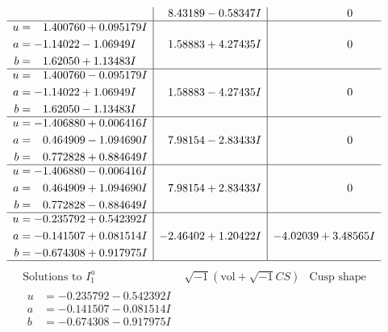 \documentclass[1p]{elsarticle_modified}
\theoremstyle{definition}
\newcommand{\I}{\sqrt{-1}}
\begin{document}
$$\begin{array}{c|c|c}
 & \phantom{-}8.43189 - 0.58347 I & \phantom{-0.000000 } 0 \\ \hline\begin{aligned}
u &= \phantom{-}1.400760 + 0.095179 I \\
a &= -1.14022 - 1.06949 I \\
b &= \phantom{-}1.62050 + 1.13483 I\end{aligned}
 & \phantom{-}1.58883 + 4.27435 I & \phantom{-0.000000 } 0 \\ \hline\begin{aligned}
u &= \phantom{-}1.400760 - 0.095179 I \\
a &= -1.14022 + 1.06949 I \\
b &= \phantom{-}1.62050 - 1.13483 I\end{aligned}
 & \phantom{-}1.58883 - 4.27435 I & \phantom{-0.000000 } 0 \\ \hline\begin{aligned}
u &= -1.406880 + 0.006416 I \\
a &= \phantom{-}0.464909 - 1.094690 I \\
b &= \phantom{-}0.772828 + 0.884649 I\end{aligned}
 & \phantom{-}7.98154 - 2.83433 I & \phantom{-0.000000 } 0 \\ \hline\begin{aligned}
u &= -1.406880 - 0.006416 I \\
a &= \phantom{-}0.464909 + 1.094690 I \\
b &= \phantom{-}0.772828 - 0.884649 I\end{aligned}
 & \phantom{-}7.98154 + 2.83433 I & \phantom{-0.000000 } 0 \\ \hline\begin{aligned}
u &= -0.235792 + 0.542392 I \\
a &= -0.141507 + 0.081514 I \\
b &= -0.674308 + 0.917975 I\end{aligned}
 & -2.46402 + 1.20422 I & -4.02039 + 3.48565 I\\
 \hline 
 \end{array}$$\newpage$$\begin{array}{c|c|c}  
\text{Solutions to }I^u_{1}& \I (\text{vol} + \sqrt{-1}CS) & \text{Cusp shape}\\
 \hline 
\begin{aligned}
u &= -0.235792 - 0.542392 I \\
a &= -0.141507 - 0.081514 I \\
b &= -0.674308 - 0.917975 I\end{aligned}

\end{array}$$
\end{document}
